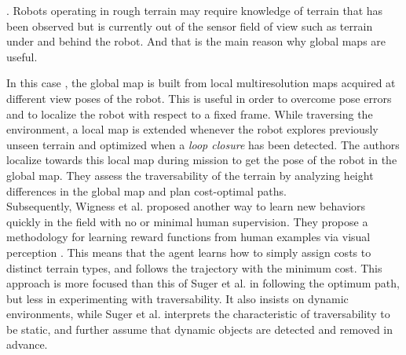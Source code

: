 \documentclass[12pt,a4paper]{report}
\newcommand{\etal}[1]{#1 et al.}
\newcommand{\term}{\textit}
\begin{document}
	\cite{Kweon}. Robots operating in rough terrain may require knowledge of terrain 
	that has been observed but is currently out of the sensor field of view such as 
	terrain under and behind the robot. And that is the main reason why global maps 
	are useful. 
	\par
	In this case \cite{Droeschel}, the global map is built from local multiresolution 
	maps acquired at different view poses of the robot. This is useful in order to 
	overcome pose errors and to localize the robot with respect to a fixed frame. 
	While traversing the environment, a local map is extended whenever the robot 
	explores previously unseen terrain and optimized when a \term{loop closure} has 
	been detected. The authors localize towards this local map during mission to get 
	the pose of the robot in the global map. They assess the traversability of the 
	terrain by analyzing height differences in the global map and plan cost-optimal 
	paths.
	\\
	
	Subsequently, \etal{Wigness} proposed another way to learn new behaviors quickly 
	in the field with no or minimal human supervision. They propose a methodology 
	for learning reward functions from human examples via visual perception 
	\cite{Wigness}. This means that the agent learns how to simply assign costs to 
	distinct terrain types, and follows the trajectory with the minimum cost. This 
	approach is more focused than this of \etal{Suger} \cite{Suger} in following the optimum path, but 
	less in experimenting with traversability. It also insists on dynamic 
	environments, while \etal{Suger} interprets the characteristic of 
	traversability to be static, and further assume that dynamic objects are 
	detected and removed in advance.
	\\
	
\end{document}
